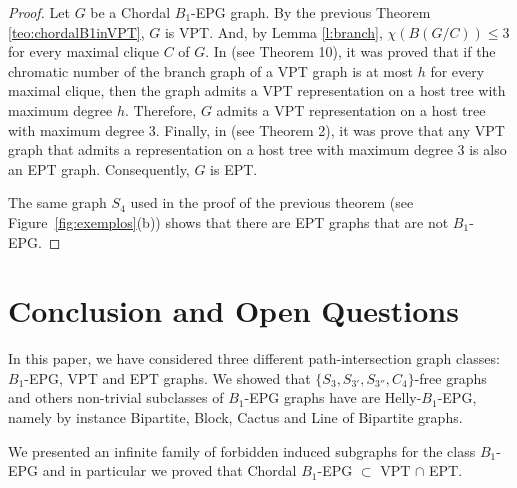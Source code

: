 \documentclass{dmgt}
\begin{document}
\begin{proof}
Let $G$ be a  Chordal $B_1$-EPG graph. By the previous Theorem \ref{teo:chordalB1inVPT}, $G$ is VPT. And,  by Lemma \ref{l:branch}, $\chi(B(G/C))\leq 3$ for every maximal clique $C$ of $G$.   In \cite{alcon2014recognizing} (see Theorem 10), it was proved that if the chromatic number of the branch graph of a VPT graph is at most $h$ for every maximal clique, then the graph admits a VPT representation on a host tree with maximum degree $h$.  Therefore, $G$ admits a VPT representation on a host tree with maximum degree 3.  Finally, in \cite{ golumbic1985edge} (see Theorem 2), it was prove that any VPT graph that  admits a representation on a host tree with maximum degree 3 is also an EPT graph. Consequently,  $G$ is EPT.

The same graph   $S_4$ used in the proof of the previous theorem (see Figure~\ref{fig:exemplos}(b)) shows that there are EPT graphs that are not $B_1$-EPG. 
%
\end{proof} 



\section{Conclusion and Open Questions}

In this paper, we have considered three different path-intersection graph classes: $B_1$-EPG, VPT and EPT graphs. We showed that  $\{S_3, S_{3'},S_{3''},C_4\}$-free graphs and others non-trivial subclasses of  $B_1$-EPG graphs have are Helly-$B_1$-EPG, namely by instance Bipartite, Block, Cactus and Line of Bipartite graphs. 
  
 We presented an infinite family of forbidden induced subgraphs for the class  $B_1$-EPG and in particular we proved  that Chordal $B_1$-EPG $\subset$ VPT $\cap$ EPT.  
 
\end{document}
